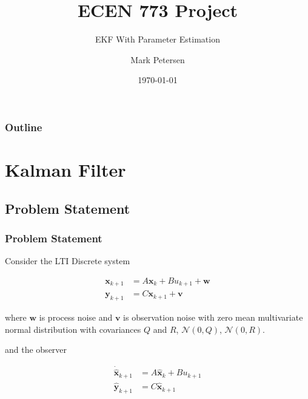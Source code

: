 \documentclass[10pt]{beamer}
\title{ECEN 773 Project}
\subtitle{EKF With Parameter Estimation}
\author{Mark Petersen}
\institute{Brigham Young University}
\date{\today}
\begin{document}
\begin{frame}
\titlepage
\end{frame}


%

\begin{frame}
\frametitle{Outline}
\tableofcontents
\end{frame}

%

\section{Kalman Filter}
\subsection{Problem Statement}


 
\begin{frame}
  \frametitle{Problem Statement}

  Consider the LTI Discrete system

  \begin{align*}
  \mathbf{x}_{k+1} &= A\mathbf{x}_k + Bu_{k+1} + \mathbf{w}\\
  \mathbf{y}_{k+1} &= C\mathbf{x}_{k+1} + \mathbf{v}
  \end{align*}

  where $\mathbf{w}$ is process noise and $\mathbf{v}$ is observation noise with zero mean multivariate normal distribution with covariances $Q$ and $R$, $\mathcal{N}(0,Q)$, $\mathcal{N}(0,R)$. \\
  \hspace{10pt}

  and the observer

  \begin{align*}
  \mathbf{\dot{\hat{x}}}_{k+1} &= A\mathbf{\hat{x}}_{k} + Bu_{k+1}\\
  \mathbf{\hat{y}}_{k+1} &= C\mathbf{\hat{x}}_{k+1}
  \end{align*}

\end{frame}
\end{document}
